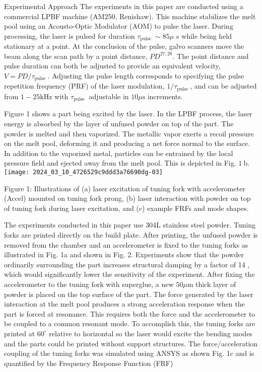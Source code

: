 \documentclass[10pt]{article}
\begin{document}
Experimental Approach The experiments in this paper are conducted using a commercial LPBF machine (AM250, Renishaw). This machine stabilizes the melt pool using an Acousto-Optic Modulator (AOM) to pulse the laser. During processing, the laser is pulsed for duration $\tau_{\text {pulse }} \sim 85 \mu$ s while being held stationary at a point. At the conclusion of the pulse, galvo scanners move the beam along the scan path by a point distance, $P D^{27,28}$. The point distance and pulse duration can both be adjusted to provide an equivalent velocity, $V=P D / \tau_{\text {pulse }}$. Adjusting the pulse length corresponds to specifying the pulse repetition frequency (PRF) of the laser modulation, $1 / \tau_{\text {pulse }}$, and can be adjusted from $1-25 \mathrm{kHz}$ with $\tau_{\text {pulse }}$ adjustable in $10 \mu \mathrm{s}$ increments.

Figure 1 shows a part being excited by the laser. In the LPBF process, the laser energy is absorbed by the layer of unfused powder on top of the part. The powder is melted and then vaporized. The metallic vapor exerts a recoil pressure on the melt pool, deforming it and producing a net force normal to the surface. In addition to the vaporized metal, particles can be entrained by the local pressure field and ejected away from the melt pool. This is depicted in Fig. $1 \mathrm{~b}$.\\
\texttt{[image: 2024\_03\_10\_4726529c9ddd3a76690dg-03]}

Figure 1: Illustrations of (a) laser excitation of tuning fork with accelerometer (Accel) mounted on tuning fork prong, (b) laser interaction with powder on top of tuning fork during laser excitation, and (c) example FRFs and mode shapes.

The experiments conducted in this paper use 304L stainless steel powder. Tuning forks are printed directly on the build plate. After printing, the unfused powder is removed from the chamber and an accelerometer is fixed to the tuning forks as illustrated in Fig. 1a and shown in Fig. 2. Experiments show that the powder ordinarily surrounding the part increases structural damping by a factor of 14 , which would significantly lower the sensitivity of the experiment. After fixing the accelerometer to the tuning fork with superglue, a new $50 \mu \mathrm{m}$ thick layer of powder is placed on the top surface of the part. The force generated by the laser interaction at the melt pool produces a strong acceleration response when the part is forced at resonance. This requires both the force and the accelerometer to be coupled to a common resonant mode. To accomplish this, the tuning forks are printed at $60^{\circ}$ relative to horizontal so the laser would excite the bending modes and the parts could be printed without support structures. The force/acceleration coupling of the tuning forks was simulated using ANSYS as shown Fig. 1c and is quantified by the Frequency Response Function (FRF)
\end{document}
